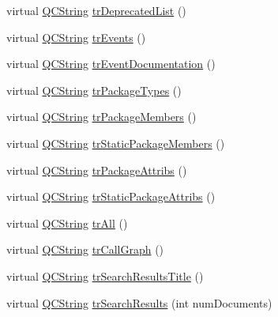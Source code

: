 \begin{DoxyCompactItemize}
\item 
virtual \mbox{\hyperlink{class_q_c_string}{Q\+C\+String}} \mbox{\hyperlink{class_translator_serbian_cyrillic_a43456ebb666ada43f0c69067c2bef5fe}{tr\+Deprecated\+List}} ()
\item 
virtual \mbox{\hyperlink{class_q_c_string}{Q\+C\+String}} \mbox{\hyperlink{class_translator_serbian_cyrillic_a44fe734c8aebeab6c68c5bdd36e379c0}{tr\+Events}} ()
\item 
virtual \mbox{\hyperlink{class_q_c_string}{Q\+C\+String}} \mbox{\hyperlink{class_translator_serbian_cyrillic_a091f20241d66086253369101262fa258}{tr\+Event\+Documentation}} ()
\item 
virtual \mbox{\hyperlink{class_q_c_string}{Q\+C\+String}} \mbox{\hyperlink{class_translator_serbian_cyrillic_ac216246c80397c7bf3b492d920ff1d0a}{tr\+Package\+Types}} ()
\item 
virtual \mbox{\hyperlink{class_q_c_string}{Q\+C\+String}} \mbox{\hyperlink{class_translator_serbian_cyrillic_abd2f75a8de502602ea5fee2d913c7ef7}{tr\+Package\+Members}} ()
\item 
virtual \mbox{\hyperlink{class_q_c_string}{Q\+C\+String}} \mbox{\hyperlink{class_translator_serbian_cyrillic_acb67cc91c86ad043ab16647054580c4e}{tr\+Static\+Package\+Members}} ()
\item 
virtual \mbox{\hyperlink{class_q_c_string}{Q\+C\+String}} \mbox{\hyperlink{class_translator_serbian_cyrillic_acb41c128e86a14c89eaec67d289f98d6}{tr\+Package\+Attribs}} ()
\item 
virtual \mbox{\hyperlink{class_q_c_string}{Q\+C\+String}} \mbox{\hyperlink{class_translator_serbian_cyrillic_aa0597bcc92c385ff7857e5098c0fb5d4}{tr\+Static\+Package\+Attribs}} ()
\item 
virtual \mbox{\hyperlink{class_q_c_string}{Q\+C\+String}} \mbox{\hyperlink{class_translator_serbian_cyrillic_ae0f9eceba130f83acd4845cd783e2558}{tr\+All}} ()
\item 
virtual \mbox{\hyperlink{class_q_c_string}{Q\+C\+String}} \mbox{\hyperlink{class_translator_serbian_cyrillic_ad0b36f6a9593830503690e1575114db9}{tr\+Call\+Graph}} ()
\item 
virtual \mbox{\hyperlink{class_q_c_string}{Q\+C\+String}} \mbox{\hyperlink{class_translator_serbian_cyrillic_a9f5fe6135ec55ca9daf2c4320c580dbe}{tr\+Search\+Results\+Title}} ()
\item 
virtual \mbox{\hyperlink{class_q_c_string}{Q\+C\+String}} \mbox{\hyperlink{class_translator_serbian_cyrillic_afe011ca7d20730f52c8c822b2fa668f6}{tr\+Search\+Results}} (int num\+Documents)

\end{DoxyCompactItemize}
